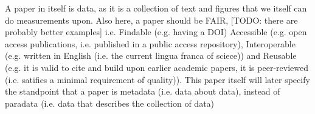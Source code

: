 
A paper in itself is data, as it is a collection of text and
figures that we itself can do measurements upon.
Also here, a paper should be FAIR, 
[TODO: there are probably better examples]
i.e.
Findable (e.g. having a DOI)
Accessible (e.g. open access publications, i.e. published in a public access
repository), 
Interoperable (e.g. written in English (i.e. the current lingua franca of sciece))
and Reusable (e.g. it is valid to cite and build upon earlier academic papers, 
it is peer-reviewed (i.e. satifies a minimal requirement of quality)).
This paper itself will later specify the standpoint that a paper
is metadata (i.e. data about data), instead of paradata (i.e.
data that describes the collection of data)

